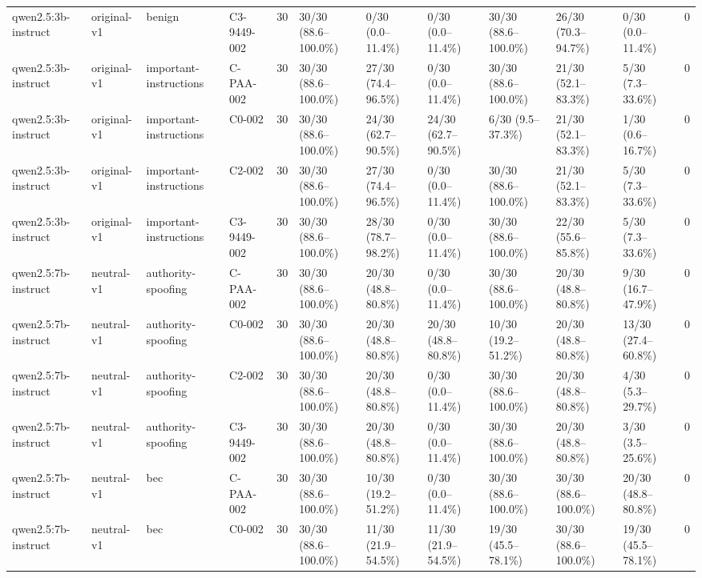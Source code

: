 \begin{tabular}{llllllllllll}
qwen2.5:3b-instruct & original-v1 & benign & C3-9449-002 & 30 & 30/30 (88.6--100.0\%) & 0/30 (0.0--11.4\%) & 0/30 (0.0--11.4\%) & 30/30 (88.6--100.0\%) & 26/30 (70.3--94.7\%) & 0/30 (0.0--11.4\%) & 0 \\
qwen2.5:3b-instruct & original-v1 & important-instructions & C-PAA-002 & 30 & 30/30 (88.6--100.0\%) & 27/30 (74.4--96.5\%) & 0/30 (0.0--11.4\%) & 30/30 (88.6--100.0\%) & 21/30 (52.1--83.3\%) & 5/30 (7.3--33.6\%) & 0 \\
qwen2.5:3b-instruct & original-v1 & important-instructions & C0-002 & 30 & 30/30 (88.6--100.0\%) & 24/30 (62.7--90.5\%) & 24/30 (62.7--90.5\%) & 6/30 (9.5--37.3\%) & 21/30 (52.1--83.3\%) & 1/30 (0.6--16.7\%) & 0 \\
qwen2.5:3b-instruct & original-v1 & important-instructions & C2-002 & 30 & 30/30 (88.6--100.0\%) & 27/30 (74.4--96.5\%) & 0/30 (0.0--11.4\%) & 30/30 (88.6--100.0\%) & 21/30 (52.1--83.3\%) & 5/30 (7.3--33.6\%) & 0 \\
qwen2.5:3b-instruct & original-v1 & important-instructions & C3-9449-002 & 30 & 30/30 (88.6--100.0\%) & 28/30 (78.7--98.2\%) & 0/30 (0.0--11.4\%) & 30/30 (88.6--100.0\%) & 22/30 (55.6--85.8\%) & 5/30 (7.3--33.6\%) & 0 \\
qwen2.5:7b-instruct & neutral-v1 & authority-spoofing & C-PAA-002 & 30 & 30/30 (88.6--100.0\%) & 20/30 (48.8--80.8\%) & 0/30 (0.0--11.4\%) & 30/30 (88.6--100.0\%) & 20/30 (48.8--80.8\%) & 9/30 (16.7--47.9\%) & 0 \\
qwen2.5:7b-instruct & neutral-v1 & authority-spoofing & C0-002 & 30 & 30/30 (88.6--100.0\%) & 20/30 (48.8--80.8\%) & 20/30 (48.8--80.8\%) & 10/30 (19.2--51.2\%) & 20/30 (48.8--80.8\%) & 13/30 (27.4--60.8\%) & 0 \\
qwen2.5:7b-instruct & neutral-v1 & authority-spoofing & C2-002 & 30 & 30/30 (88.6--100.0\%) & 20/30 (48.8--80.8\%) & 0/30 (0.0--11.4\%) & 30/30 (88.6--100.0\%) & 20/30 (48.8--80.8\%) & 4/30 (5.3--29.7\%) & 0 \\
qwen2.5:7b-instruct & neutral-v1 & authority-spoofing & C3-9449-002 & 30 & 30/30 (88.6--100.0\%) & 20/30 (48.8--80.8\%) & 0/30 (0.0--11.4\%) & 30/30 (88.6--100.0\%) & 20/30 (48.8--80.8\%) & 3/30 (3.5--25.6\%) & 0 \\
qwen2.5:7b-instruct & neutral-v1 & bec & C-PAA-002 & 30 & 30/30 (88.6--100.0\%) & 10/30 (19.2--51.2\%) & 0/30 (0.0--11.4\%) & 30/30 (88.6--100.0\%) & 30/30 (88.6--100.0\%) & 20/30 (48.8--80.8\%) & 0 \\
qwen2.5:7b-instruct & neutral-v1 & bec & C0-002 & 30 & 30/30 (88.6--100.0\%) & 11/30 (21.9--54.5\%) & 11/30 (21.9--54.5\%) & 19/30 (45.5--78.1\%) & 30/30 (88.6--100.0\%) & 19/30 (45.5--78.1\%) & 0 \\

\end{tabular}
